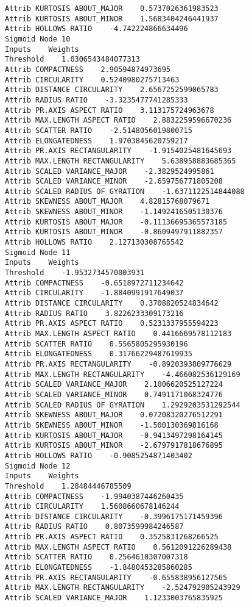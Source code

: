 \documentclass[
	article,			%
	11pt,				%
	oneside,			%
	a4paper,			%
	english,			%
	brazil,				%
	sumario=tradicional
	]{abntex2}
\begin{document}
\begin{lstlisting}
Attrib KURTOSIS ABOUT_MAJOR    0.5737026361983523
Attrib KURTOSIS ABOUT_MINOR    1.5683404246441937
Attrib HOLLOWS RATIO    -4.742224866634496
Sigmoid Node 10
Inputs    Weights
Threshold    1.0306543484077313
Attrib COMPACTNESS    2.90594874973695
Attrib CIRCULARITY    0.5240980275713463
Attrib DISTANCE CIRCULARITY    2.6567252599065783
Attrib RADIUS RATIO    -3.3235477741285333
Attrib PR.AXIS ASPECT RATIO    3.113175724963678
Attrib MAX.LENGTH ASPECT RATIO    2.8832259596670236
Attrib SCATTER RATIO    -2.5148056019800715
Attrib ELONGATEDNESS    1.9703845620759217
Attrib PR.AXIS RECTANGULARITY    -1.9154025481645693
Attrib MAX.LENGTH RECTANGULARITY    5.638958883685365
Attrib SCALED VARIANCE_MAJOR    -2.3829524995861
Attrib SCALED VARIANCE_MINOR    -2.659756771805208
Attrib SCALED RADIUS OF GYRATION    -1.6371122514844088
Attrib SKEWNESS ABOUT_MAJOR    4.82815768079671
Attrib SKEWNESS ABOUT_MINOR    -1.1492416505130376
Attrib KURTOSIS ABOUT_MAJOR    -0.11136695365573185
Attrib KURTOSIS ABOUT_MINOR    -0.8609497911882357
Attrib HOLLOWS RATIO    2.127130308765542
Sigmoid Node 11
Inputs    Weights
Threshold    -1.9532734570003931
Attrib COMPACTNESS    -0.6518972711234642
Attrib CIRCULARITY    -1.8840991917649037
Attrib DISTANCE CIRCULARITY    0.3708820524834642
Attrib RADIUS RATIO    3.8226233309173216
Attrib PR.AXIS ASPECT RATIO    0.5231337955594223
Attrib MAX.LENGTH ASPECT RATIO    0.4416669578112183
Attrib SCATTER RATIO    0.5565805295930196
Attrib ELONGATEDNESS    0.31766229487619935
Attrib PR.AXIS RECTANGULARITY    -0.8920393809776629
Attrib MAX.LENGTH RECTANGULARITY    -4.466082536129169
Attrib SCALED VARIANCE_MAJOR    2.1006620525127224
Attrib SCALED VARIANCE_MINOR    0.7491171068324776
Attrib SCALED RADIUS OF GYRATION    1.2929203531292544
Attrib SKEWNESS ABOUT_MAJOR    0.07208320276512291
Attrib SKEWNESS ABOUT_MINOR    -1.500130369816168
Attrib KURTOSIS ABOUT_MAJOR    -0.9413497298164145
Attrib KURTOSIS ABOUT_MINOR    -2.6797917818676895
Attrib HOLLOWS RATIO    -0.9085254871403402
Sigmoid Node 12
Inputs    Weights
Threshold    1.28484446785509
Attrib COMPACTNESS    -1.9940387446260435
Attrib CIRCULARITY    1.5608660678146244
Attrib DISTANCE CIRCULARITY    -0.3996175171459396
Attrib RADIUS RATIO    0.8073599984246587
Attrib PR.AXIS ASPECT RATIO    0.3525831268266525
Attrib MAX.LENGTH ASPECT RATIO    0.5612091226289438
Attrib SCATTER RATIO    0.2564610307007318
Attrib ELONGATEDNESS    -1.8480453285860285
Attrib PR.AXIS RECTANGULARITY    -0.655838956127565
Attrib MAX.LENGTH RECTANGULARITY    -2.524792905243929
Attrib SCALED VARIANCE_MAJOR    1.1233003765835925

\end{lstlisting}
\end{document}
